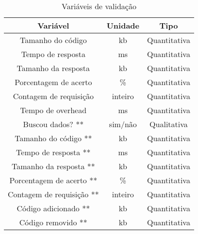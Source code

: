 \begin{table}[H]
  \centering
  \begin{tabular}{|c|c|c|}
    \hline
    Variável & Unidade & Tipo \\
    \hline
    Tamanho do código & kb & Quantitativa \\
    \hline
    Tempo de resposta & ms & Quantitativa \\
    \hline
    Tamanho da resposta & kb & Quantitativa \\
    \hline
    Porcentagem de acerto & \% & Quantitativa \\
    \hline
    Contagem de requisição & inteiro & Quantitativa \\
    \hline
    Tempo de overhead & ms & Quantitativa \\
    \hline
    Buscou dados? ** & sim/não & Qualitativa \\
    \hline
    Tamanho do código ** & kb & Quantitativa \\
    \hline
    Tempo de resposta ** & ms & Quantitativa \\
    \hline
    Tamanho da resposta ** & kb & Quantitativa \\
    \hline
    Porcentagem de acerto ** & \% & Quantitativa \\
    \hline
    Contagem de requisição ** & inteiro & Quantitativa \\
    \hline
  	Código adicionado ** & kb & Quantitativa \\
    \hline
  	Código removido ** & kb & Quantitativa \\
    \hline
  \end{tabular}
  \caption{Variáveis de validação}
\end{table}

 
 
 
 
 
 

 
